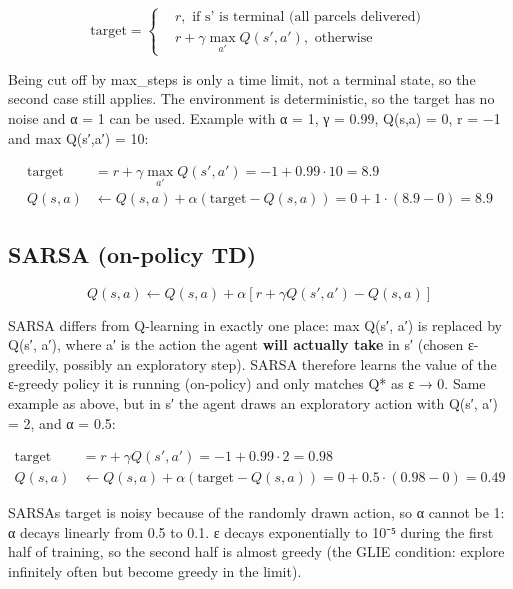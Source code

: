 \documentclass[12pt,a4paper]{article}
\begin{document}
\[\text{target} = \left\{ \begin{aligned}
 & r,\text{ if s' is terminal (all parcels delivered)} \\
 & r + \gamma\max_{a'}{Q(s',a')},\text{ otherwise}
\end{aligned} \right.\ \]

Being cut off by max\_steps is only a time limit, not a terminal state,
so the second case still applies. The environment is deterministic, so
the target has no noise and α = 1 can be used. Example with α = 1, γ =
0.99, Q(s,a) = 0, r = −1 and max Q(s′,a′) = 10:

\[\begin{aligned}
\text{target} & = r + \gamma\max_{a'}{Q(s',a')} = - 1 + 0.99 \cdot 10 = 8.9 \\
Q(s,a) & \leftarrow Q(s,a) + \alpha\left( \text{target} - Q(s,a) \right) = 0 + 1 \cdot (8.9 - 0) = 8.9
\end{aligned}\]

\hypertarget{sarsa-on-policy-td}{%
\subsection{SARSA (on-policy TD)}\label{sarsa-on-policy-td}}

\[Q(s,a) \leftarrow Q(s,a) + \alpha\left\lbrack r + \gamma Q(s',a') - Q(s,a) \right\rbrack\]

SARSA differs from Q-learning in exactly one place: max Q(s′, a′) is
replaced by Q(s′, a′), where a′ is the action the agent \textbf{will
actually take} in s′ (chosen ε-greedily, possibly an exploratory step).
SARSA therefore learns the value of the ε-greedy policy it is running
(on-policy) and only matches Q* as ε → 0. Same example as above, but in
s′ the agent draws an exploratory action with Q(s′, a′) = 2, and α =
0.5:

\[\begin{aligned}
\text{target} & = r + \gamma Q(s',a') = - 1 + 0.99 \cdot 2 = 0.98 \\
Q(s,a) & \leftarrow Q(s,a) + \alpha\left( \text{target} - Q(s,a) \right) = 0 + 0.5 \cdot (0.98 - 0) = 0.49
\end{aligned}\]

SARSA\textquotesingle s target is noisy because of the randomly drawn
action, so α cannot be 1: α decays linearly from 0.5 to 0.1. ε decays
exponentially to 10⁻⁵ during the first half of training, so the second
half is almost greedy (the GLIE condition: explore infinitely often but
become greedy in the limit).
\end{document}
